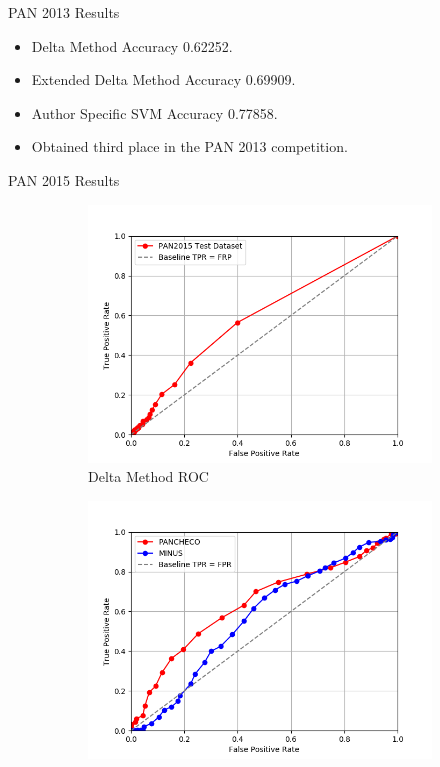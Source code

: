 \documentclass[10pt]{beamer}
\begin{document}
\begin{frame}[fragile]{PAN 2013 Results}

    \begin{itemize}
        \item Delta Method Accuracy 0.62252.
        \item Extended Delta Method Accuracy 0.69909.
        \item Author Specific SVM Accuracy 0.77858.
        \item Obtained third place in the PAN 2013 competition.
    \end{itemize}

\end{frame}

\begin{frame}[fragile]{PAN 2015 Results}
    \begin{figure}
        \begin{subfigure}{.4\textwidth}
            \includegraphics[width=\textwidth]{../../report/pictures/delta_method_roc.png}
            \caption{Delta Method ROC}
        \end{subfigure}
        \begin{subfigure}{.4\textwidth}
            \includegraphics[width=\textwidth]{../../report/pictures/forest_roc.png}

\end{subfigure}
\end{figure}
\end{frame}
\end{document}
